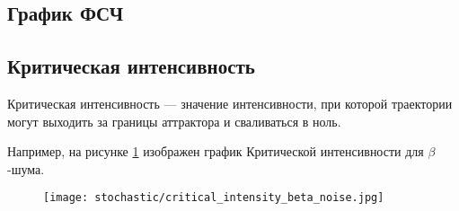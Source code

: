 
    \subsection{График ФСЧ}


    \subsection{Критическая интенсивность}

        Критическая интенсивность --- значение интенсивности, при которой траектории могут выходить за границы аттрактора и сваливаться в ноль.

        Например, на рисунке \ref{critical_intensity_beta_noise} изображен график Критической интенсивности для \(\beta\)-шума.



        \begin{figure}
            \centering
            \texttt{[image: stochastic/critical\_intensity\_beta\_noise.jpg]}
        
            \captionsetup{justification=centering}
            \caption{}
            \label{critical_intensity_beta_noise}
        \end{figure}
        